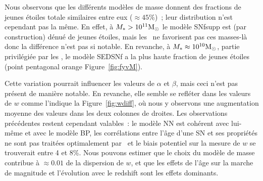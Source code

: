 \documentclass[../main/main.tex]{subfiles}
\begin{document}


Nous observons que les différents modèles de masse donnent des fractions de
jeunes étoiles totale similaires entre eux ($\approx 45\%$)~; leur distribution
n'est cependant pas la même. En effet, à $M_* > 10^{11}\si{\Msun}$ le modèle
SNfsupp est (par construction) dénué de jeunes étoiles, mais les \wgtmap\ ne
favorisent pas ces masses-là donc la différence n'est pas si notable. En
revanche, à $M_* \approx 10^{10}\si{\Msun}$, partie privilégiée par les \wgtmap,
le modèle SEDSNf a la plus haute fraction de jeunes étoiles (point pentagonal
orange Figure~\ref{fig:fyvM}).

Cette variation pourrait influencer les valeurs de $\alpha$ et $\beta$, mais
ceci n'est pas présent de manière notable. En revanche, elle semble se refléter
dans les valeurs de $w$ comme l'indique la Figure~\ref{fig:wdiff}, où nous y
observons une augmentation moyenne des valeurs dans les deux colonnes de
droites. Les observations précédentes restent cependant valables~: le modèle NN
est cohérent avec lui-même et avec le modèle BP, les corrélations entre l'âge
d'une SN et ses propriétés ne sont pas traitées optimalement par \snana\ et le
biais potentiel sur la mesure de $w$ se trouverait entre 4 et 8\%. Nous pouvons
estimer que le choix du modèle de masse contribue à $\approx \num{0.01}$ de la
dispersion de $w$, et que les effets de l'âge sur la marche de magnitude et
l'évolution avec le redshift sont les effets dominants.
\end{document}
